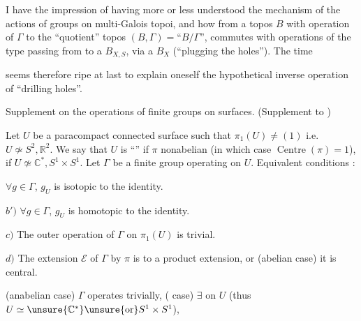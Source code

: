 I have the impression of having more or less
understood the mechanism of the actions of
groups on multi-Galois topoi,
and how 
from a topos $B$ with operation of $\Gamma$
to the ``quotient'' topos $(B,\Gamma)=\text{``}B/\Gamma\text{''}$,
commutes with operations of the type
passing from
to a $B_{X,S}$, via a
$B_X$ (``plugging the holes'').  The time


seems therefore ripe at last to explain oneself
 the hypothetical inverse operation
of ``drilling  holes''.

 Supplement on the operations of finite groups
on surfaces. (Supplement to )

Let $U$ be a paracompact connected surface \unsure{!}
such that $\pi_1(U)\ne(1)$ i.e. $U\not\simeq S^2,\mathbb R^2$.
We say that $U$ is ``'' if
$\pi$ nonabelian (in which case $\operatorname{Centre}(\pi)=1$),
 if $U\not\simeq\mathbb C^*,S^1\times S^1$.
Let $\Gamma$
be a finite group operating on $U$. Equivalent
conditions :

  $\forall g\in\Gamma$, $g_U$ is isotopic to the identity.

$b')$ $\forall g\in\Gamma$, $g_U$ is homotopic to the identity.

$c)$ The outer operation of $\Gamma$ on
$\pi_1(U)$ is trivial.

$d)$  The extension $\mathcal E$ of $\Gamma$ by $\pi$ is
 to a product extension, or (abelian case)
 it is central.

 (anabelian case) $\Gamma$ operates trivially,
( case) $\exists$ 
on $U$ (thus $U\simeq\unsure{\mathbb C^*} \unsure{\text{or}} S^1\times S^1$),
\deleted{[more intrinsically $U=(\pi\otimes_{\mathbb Z}\unsure{\mathbb C})/\pi$
\illegible{4}]}

